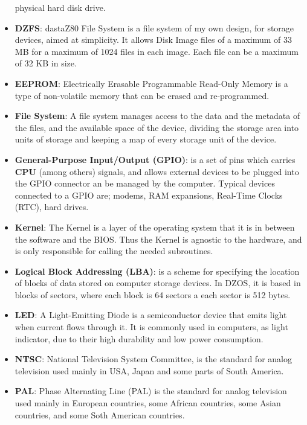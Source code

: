 \begin{itemize}
        physical hard disk drive.
    \item \textbf{DZFS}: dastaZ80 File System is a file system of my own design,
        for storage devices, aimed at simplicity. It allows Disk Image files of
        a maximum of 33 MB for a maximum of 1024 files in each image. Each file
        can be a maximum of 32 KB in size.
    \item \textbf{EEPROM}: Electrically Erasable Programmable Read-Only Memory
        is a type of non-volatile memory that can be erased and re-programmed.
    \item \textbf{File System}: A file system manages access to the data and the
        metadata of the files, and the available space of the device, dividing
        the storage area into units of storage and keeping a map of every
        storage unit of the device.
    \item \textbf{General-Purpose Input/Output (GPIO)}: is a set of pins which
        carries \textbf{CPU} (among others) signals, and allows external devices
        to be plugged into the GPIO connector an be managed by the computer.
        Typical devices connected to a GPIO are; modems, RAM expansions,
        Real-Time Clocks (RTC), hard drives.
    \item \textbf{Kernel}: The Kernel is a layer of the operating system that
        it is in between the software and the BIOS. Thus the Kernel is agnostic
        to the hardware, and is only responsible for calling the needed
        subroutines.
    \item \textbf{Logical Block Addressing (LBA)}: is a scheme for specifying
        the location of blocks of data stored on computer storage devices. In
        DZOS, it is based in blocks of sectors, where each block is 64 sectors
        a each sector is 512 bytes.
    \item \textbf{LED}: A Light-Emitting Diode is a semiconductor device that
        emits light when current flows through it. It is commonly used in
        computers, as light indicator, due to their high durability and low
        power consumption.
        \item \textbf{NTSC}: National Television System Committee, is the
        standard for analog television used mainly in USA, Japan and some parts
        of South America.
    \item \textbf{PAL}: Phase Alternating Line (PAL) is the standard for analog
        television used mainly in European countries, some African countries,
        some Asian countries, and some Soth American countries.

\end{itemize}
